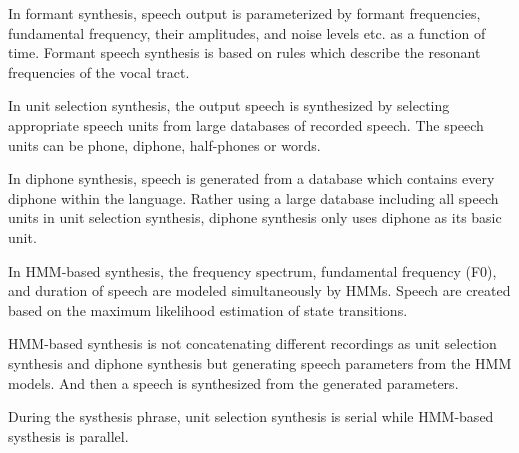 \documentclass[12pt]{article}
\newenvironment{problem}[2][Problem]{\begin{trivlist}
\item[\hskip \labelsep {\bfseries #1}\hskip \labelsep {\bfseries #2.}]}{\end{trivlist}}
\begin{document}
\begin{problem}{2.1}
    In formant synthesis, speech output is parameterized by formant frequencies,
    fundamental frequency, their amplitudes, and noise levels etc. as a function
    of time. Formant speech synthesis is based on rules which describe
    the resonant frequencies of the vocal tract.

    In unit selection synthesis, the output speech is synthesized by selecting
    appropriate speech units from large databases of recorded speech.
    The speech units can be phone, diphone, half-phones or words.

    In diphone synthesis, speech is generated from a database which contains
    every diphone within the language.
    Rather using a large database including all speech units in unit selection
    synthesis, diphone synthesis only uses diphone as its basic unit.

    In HMM-based synthesis, the frequency spectrum,
    fundamental frequency (F0), and duration of speech
    are modeled simultaneously by HMMs.
    Speech are created based on the maximum likelihood estimation of state transitions.

    HMM-based synthesis is not concatenating different recordings
    as unit selection synthesis and diphone synthesis but generating speech parameters
    from the HMM models. And then a speech is synthesized from the generated parameters.

    During the systhesis phrase, unit selection synthesis is serial while HMM-based
    systhesis is parallel.
\end{problem}
\end{document}
